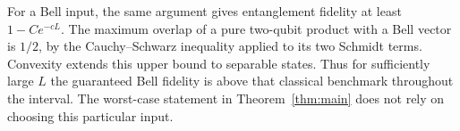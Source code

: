 For a Bell input, the same argument gives entanglement fidelity
at least \(1-Ce^{-cL}\). The maximum overlap of a pure two-qubit
product with a Bell vector is \(1/2\), by the Cauchy--Schwarz
inequality applied to its two Schmidt terms. Convexity extends
this upper bound to separable states. Thus for sufficiently
large \(L\) the guaranteed Bell fidelity is above that classical
benchmark throughout the interval. The worst-case statement in
Theorem~\ref{thm:main} does not rely on choosing this particular
input.
